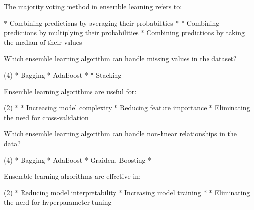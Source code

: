 \documentclass[10pt]{extarticle}
\begin{document}
\begin{exercise}
    The majority voting method in ensemble learning refers to:
    \begin{choice}
        * Combining predictions by averaging their probabilities
        * 
        * Combining predictions by multiplying their probabilities
        * Combining predictions by taking the median of their values
    \end{choice}
\end{exercise}
\begin{solution}
\end{solution}

\begin{exercise}
    Which ensemble learning algorithm can handle missing values in the dataset?
    \begin{choice} (4)
        * Bagging
        * AdaBoost
        * 
        * Stacking
    \end{choice}
\end{exercise}
\begin{solution}
\end{solution}

\begin{exercise}
    Ensemble learning algorithms are useful for:
    \begin{choice} (2)
        * 
        * Increasing model complexity
        * Reducing feature importance
        * Eliminating the need for cross-validation
    \end{choice}
\end{exercise}
\begin{solution}
\end{solution}

\begin{exercise}
    Which ensemble learning algorithm can handle non-linear relationships in the data?
    \begin{choice} (4)
        * Bagging
        * AdaBoost
        * Graident Boosting
        * 
    \end{choice}
\end{exercise}
\begin{solution}
\end{solution}

\begin{exercise}
    Ensemble learning algorithms are effective in:
    \begin{choice} (2)
        * Reducing model interpretability
        * Increasing model training
        * 
        * Eliminating the need for hyperparameter tuning
    \end{choice}
\end{exercise}
\begin{solution}
\end{solution}
\end{document}

